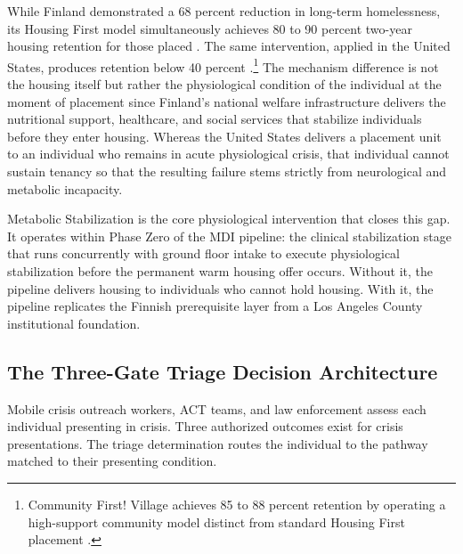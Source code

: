 \documentclass[12pt, letterpaper]{article}
\begin{document}
While Finland demonstrated a 68 percent reduction in long-term homelessness, its Housing First model simultaneously achieves 80 to 90 percent two-year housing retention for those placed \citep{finland_housing_first_2023, feantsa_finland_2022}. The same intervention, applied in the United States, produces retention below 40 percent \citep{ucsf_bhhi_2023}.\footnote{Community First! Village achieves 85 to 88 percent retention by operating a high-support community model distinct from standard Housing First placement \citep{community_first_village_2024}.} The mechanism difference is not the housing itself but rather the physiological condition of the individual at the moment of placement since Finland's national welfare infrastructure delivers the nutritional support, healthcare, and social services that stabilize individuals before they enter housing. Whereas the United States delivers a placement unit to an individual who remains in acute physiological crisis, that individual cannot sustain tenancy so that the resulting failure stems strictly from neurological and metabolic incapacity.

Metabolic Stabilization is the core physiological intervention that closes this gap. It operates within Phase Zero of the MDI pipeline: the clinical stabilization stage that runs concurrently with ground floor intake to execute physiological stabilization before the permanent warm housing offer occurs. Without it, the pipeline delivers housing to individuals who cannot hold housing. With it, the pipeline replicates the Finnish prerequisite layer from a Los Angeles County institutional foundation.

\subsection{The Three-Gate Triage Decision Architecture}

Mobile crisis outreach workers, ACT teams, and law enforcement assess each individual presenting in crisis. Three authorized outcomes exist for crisis presentations. The triage determination routes the individual to the pathway matched to their presenting condition.
\end{document}
